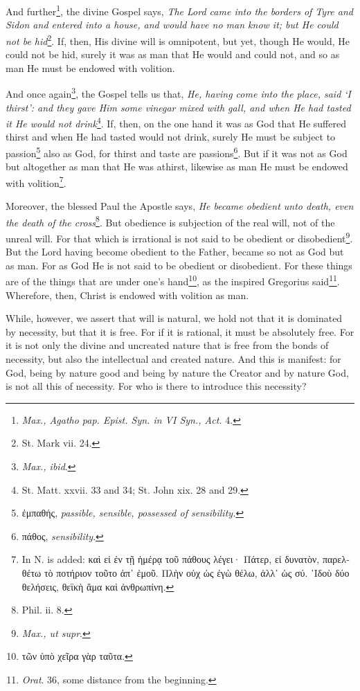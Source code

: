 And further\footnote{\emph{Max., Agatho pap. Epist. Syn. in VI Syn., Act. }4.}, the divine Gospel says, \emph{The Lord came into the borders of Tyre and Sidon and entered into a house, and would have no man know it; but He could not be hid}\footnote{St. Mark vii. 24.}. If, then, His divine will is omnipotent, but yet, though He would, He could not be hid, surely it was as man that He would and could not, and so as man He must be endowed with volition.

And once again\footnote{\emph{Max., ibid}.}, the Gospel tells us that, \emph{He, having come into the place, said ‘I thirst’: and they gave Him some vinegar mixed with gall, and when He had tasted it He would not drink}\footnote{St. Matt. xxvii. 33 and 34; St. John xix. 28 and 29.}. If, then, on the one hand it was as God that He suffered thirst and when He had tasted would not drink, surely He must be subject to passion\footnote{\textgreek{ἐμπαθής}, \emph{passible, sensible, possessed of sensibility.}} also as God, for thirst and taste are passions\footnote{\textgreek{πάθος}, \emph{sensibility}.}. But if it was not as God but altogether as man that He was athirst, likewise as man He must be endowed with volition\footnote{In N. is added: \textgreek{καὶ εἰ ἐν τῇ ἡμέρᾳ τοῦ πάθους λέγει· Πάτερ, εἰ δυνατὸν, παρελθέτω τὸ ποτήριον τοῦτο ἀπ᾽ ἐμοῦ. Πλὴν οὐχ ὡς ἐγὼ θέλω, ἀλλ᾽ ὡς σύ. ᾽Ιδοὺ δύο θελήσεις, θεϊκὴ ἅμα καὶ ἀνθρωπίνη}.}.

Moreover, the blessed Paul the Apostle says, \emph{He became obedient unto death, even the death of the cross}\footnote{Phil. ii. 8.}. But obedience is subjection of the real will, not of the unreal will. For that which is irrational is not said to be obedient or disobedient\footnote{\emph{Max., ut supr}.}. But the Lord having become obedient to the Father, became so not as God but as man. For as God He is not said to be obedient or disobedient. For these things are of the things that are under one’s hand\footnote{\textgreek{τῶν ὑπὸ χεῖρα γὰρ ταῦτα}.}, as the inspired Gregorius said\footnote{\emph{Orat}. 36, some distance from the beginning.}. Wherefore, then, Christ is endowed with volition as man.

While, however, we assert that will is natural, we hold not that it is dominated by necessity, but that it is free. For if it is rational, it must be absolutely free. For it is not only the divine and uncreated nature that is free from the bonds of necessity, but also the intellectual and created nature. And this is manifest: for God, being by nature good and being by nature the Creator and by nature God, is not all this of necessity. For who is there to introduce this necessity?


